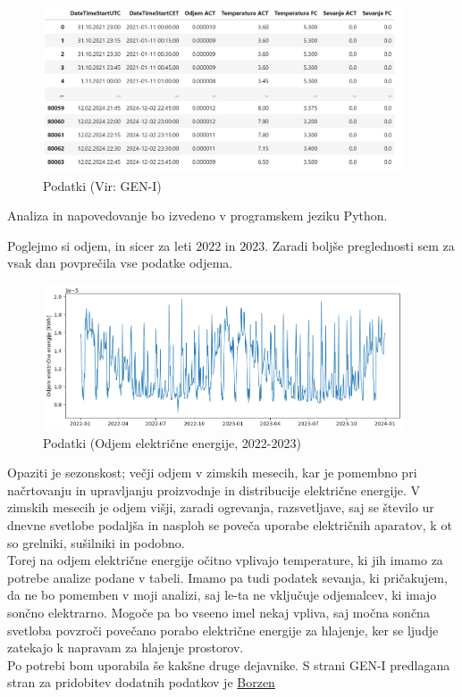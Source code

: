 \documentclass[a4paper, 10pt]{article}
\begin{document}
\begin{figure}[h!]
    \centering
    \caption{Podatki (Vir: GEN-I)}\par\medskip
    \includegraphics[width=0.95\textwidth]{tabela.png}
\end{figure}



Analiza in napovedovanje bo izvedeno v programskem jeziku Python.

Poglejmo si odjem, in sicer za leti $2022$ in $2023$. Zaradi boljše preglednosti sem za vsak dan povprečila vse podatke odjema.


\begin{figure}[h!]
    \centering
    \caption{Podatki (Odjem električne energije, 2022-2023)}\par\medskip
    \includegraphics[width=0.95\textwidth]{output.png}
\end{figure}



\noindent Opaziti je sezonskost; večji odjem v zimskih mesecih, kar je pomembno pri 
načrtovanju in upravljanju proizvodnje in distribucije električne energije. 
V zimskih mesecih je odjem višji, zaradi ogrevanja, razsvetljave, saj se število ur 
dnevne svetlobe podaljša in nasploh se poveča uporabe električnih aparatov, k
ot so grelniki, sušilniki in podobno.  \\

\noindent Torej na odjem električne energije očitno vplivajo temperature, 
ki jih imamo za potrebe analize podane v tabeli. Imamo pa tudi podatek 
sevanja, ki pričakujem, da ne bo pomemben v moji analizi, saj le-ta ne 
vključuje odjemalcev, ki imajo sončno elektrarno. Mogoče pa bo vseeno 
imel nekaj vpliva, saj močna sončna svetloba povzroči povečano porabo 
električne energije za hlajenje, ker se ljudje zatekajo k napravam za 
hlajenje prostorov. \\

\noindent Po potrebi bom uporabila še kakšne druge dejavnike. S strani GEN-I 
predlagana stran za pridobitev dodatnih podatkov je \href{https://ot.borzen.si/Domov/Podatki-trga/Koli%C4%8Dine-in-zneski-izravnave}{Borzen}
\end{document}
